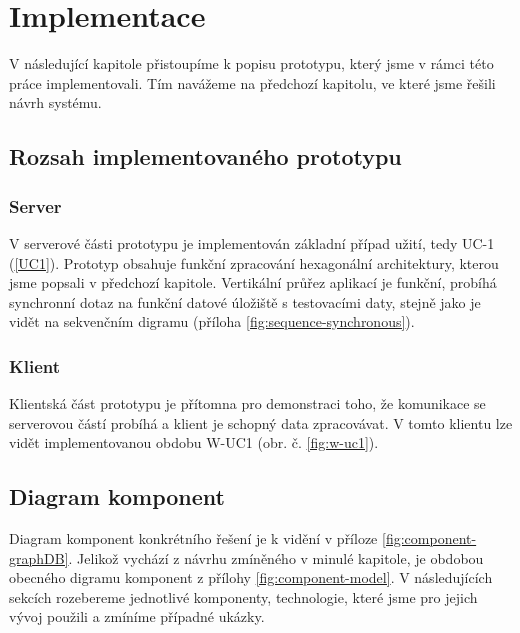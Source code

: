 \chapter{Implementace} \label{chap:implementation}
V následující kapitole přistoupíme k popisu prototypu, který jsme v rámci této práce implementovali. Tím navážeme na předchozí kapitolu, ve které jsme řešili návrh systému.\par

\section{Rozsah implementovaného prototypu}
\subsection{Server}
V serverové části prototypu je implementován základní případ užití, tedy UC-1 (\ref{UC1}). Prototyp obsahuje funkční zpracování hexagonální architektury, kterou jsme popsali v předchozí kapitole. Vertikální průřez aplikací je funkční, probíhá synchronní dotaz na funkční datové úložiště s testovacími daty, stejně jako je vidět na sekvenčním digramu (příloha \ref{fig:sequence-synchronous}).\par
\subsection{Klient}
Klientská část prototypu je přítomna pro demonstraci toho, že komunikace se serverovou částí probíhá a klient je schopný data zpracovávat. V tomto klientu lze vidět implementovanou obdobu W-UC1 (obr. č. \ref{fig:w-uc1}).

\section{Diagram komponent}
Diagram komponent konkrétního řešení je k vidění v příloze \ref{fig:component-graphDB}. Jelikož vychází z návrhu zmíněného v minulé kapitole, je obdobou obecného digramu komponent z přílohy \ref{fig:component-model}. V následujících sekcích rozebereme jednotlivé komponenty, technologie, které jsme pro jejich vývoj použili a zmíníme případné ukázky.

